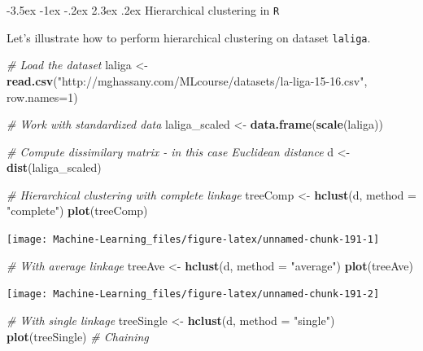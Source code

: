 \documentclass[]{book}
\makeatletter
\newenvironment{Shaded}{\begin{snugshade}}{\end{snugshade}}
\newcommand{\KeywordTok}[1]{\textcolor[rgb]{0.13,0.29,0.53}{\textbf{#1}}}
\newcommand{\DataTypeTok}[1]{\textcolor[rgb]{0.13,0.29,0.53}{#1}}
\newcommand{\DecValTok}[1]{\textcolor[rgb]{0.00,0.00,0.81}{#1}}
\newcommand{\StringTok}[1]{\textcolor[rgb]{0.31,0.60,0.02}{#1}}
\newcommand{\CommentTok}[1]{\textcolor[rgb]{0.56,0.35,0.01}{\textit{#1}}}
\newcommand{\NormalTok}[1]{#1}
\renewcommand\section{\@startsection {section}{1}{\z@}%
                                   {-3.5ex \@plus -1ex \@minus -.2ex}%
                                   {2.3ex \@plus.2ex}%
                                   {\normalfont\Large\bfseries\color{ForestGreen}}}
\theoremstyle{definition}
\theoremstyle{definition}
\theoremstyle{definition}
\theoremstyle{remark}
\makeatother
\begin{document}
\section{\texorpdfstring{Hierarchical clustering in
\texttt{R}}{Hierarchical clustering in R}}\label{hierarchical-clustering-in-r}

Let's illustrate how to perform hierarchical clustering on dataset
\texttt{laliga}.

\begin{Shaded}
\begin{Highlighting}[]
\CommentTok{# Load the dataset}
\NormalTok{laliga <-}\StringTok{ }\KeywordTok{read.csv}\NormalTok{(}\StringTok{"http://mghassany.com/MLcourse/datasets/la-liga-15-16.csv"}\NormalTok{, }\DataTypeTok{row.names=}\DecValTok{1}\NormalTok{)}

\CommentTok{# Work with standardized data}
\NormalTok{laliga_scaled <-}\StringTok{ }\KeywordTok{data.frame}\NormalTok{(}\KeywordTok{scale}\NormalTok{(laliga))}

\CommentTok{# Compute dissimilary matrix - in this case Euclidean distance}
\NormalTok{d <-}\StringTok{ }\KeywordTok{dist}\NormalTok{(laliga_scaled)}

\CommentTok{# Hierarchical clustering with complete linkage}
\NormalTok{treeComp <-}\StringTok{ }\KeywordTok{hclust}\NormalTok{(d, }\DataTypeTok{method =} \StringTok{"complete"}\NormalTok{)}
\KeywordTok{plot}\NormalTok{(treeComp)}
\end{Highlighting}
\end{Shaded}

\begin{center}\texttt{[image: Machine-Learning\_files/figure-latex/unnamed-chunk-191-1]} \end{center}

\begin{Shaded}
\begin{Highlighting}[]

\CommentTok{# With average linkage}
\NormalTok{treeAve <-}\StringTok{ }\KeywordTok{hclust}\NormalTok{(d, }\DataTypeTok{method =} \StringTok{"average"}\NormalTok{)}
\KeywordTok{plot}\NormalTok{(treeAve)}
\end{Highlighting}
\end{Shaded}

\begin{center}\texttt{[image: Machine-Learning\_files/figure-latex/unnamed-chunk-191-2]} \end{center}

\begin{Shaded}
\begin{Highlighting}[]

\CommentTok{# With single linkage}
\NormalTok{treeSingle <-}\StringTok{ }\KeywordTok{hclust}\NormalTok{(d, }\DataTypeTok{method =} \StringTok{"single"}\NormalTok{)}
\KeywordTok{plot}\NormalTok{(treeSingle) }\CommentTok{# Chaining}
\end{Highlighting}
\end{Shaded}
\end{document}
